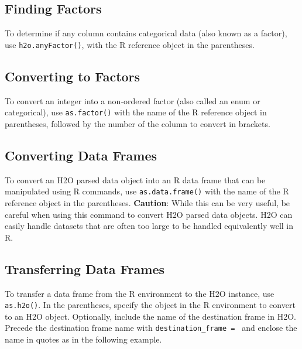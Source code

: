 {{\subsection{Finding Factors}
To determine if any column contains categorical data (also known as a factor), use {\texttt{h2o.anyFactor()}}, with the R reference object in the parentheses.

\waterExampleInR
\medskip


\subsection{Converting to Factors}
To convert an integer into a non-ordered factor (also called an enum or categorical), use {\texttt{as.factor()}} with the name of the R reference object in parentheses, followed by the number of the column to convert in brackets.

\waterExampleInR
\medskip


\subsection{Converting Data Frames}

To convert an H2O parsed data object into an R data frame that can be manipulated using R commands, use {\texttt{as.data.frame()}} with the name of the R reference object in the parentheses.
{\textbf{Caution}}: While this can be very useful, be careful when using this command to convert H2O parsed data objects. H2O can easily handle datasets that are often too large to be handled equivalently well in R.

\waterExampleInR
\medskip


\subsection{Transferring Data Frames}
To transfer a data frame from the R environment to the H2O instance, use  {\texttt{as.h2o()}}. In the parentheses, specify the object in the R environment to convert to an H2O object. Optionally, include the name of the destination frame in H2O. Precede the destination frame name with {\texttt{destination\_frame = }} and enclose the name in quotes as in the following example.

\waterExampleInR
\medskip



}}
